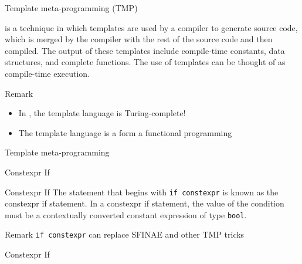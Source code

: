 \begin{frame}{Template meta-programming (TMP)}{}
  \begin{definition}
     is a technique in which templates are used by a compiler to generate source code, which is merged by the compiler with the rest of the source code and then compiled. The output of these templates include compile-time constants, data structures, and complete functions. The use of templates can be thought of as compile-time execution.
  \end{definition}

  \begin{block}{Remark}
    \begin{itemize}
    \item
      In \CCLang, the template language is Turing-complete!
    \item
      The template language is a form a functional programming
    \end{itemize}
  \end{block}
\end{frame}

\begin{frame}{Template meta-programming}{}
  \begin{example}
  \end{example}
\end{frame}




\begin{frame}{Constexpr If}{}
  \begin{block}{Constexpr If}
    The statement that begins with \lstinline!if constexpr! is known as the constexpr if statement.
    In a constexpr if statement, the value of the condition must be a contextually converted constant expression of type \lstinline!bool!.
  \end{block}

  \begin{block}{Remark}
    \lstinline!if constexpr! can replace SFINAE and other TMP tricks
  \end{block}
\end{frame}

\begin{frame}{Constexpr If}{}
  \begin{example}[Constexpr If]
  \end{example}
\end{frame}


